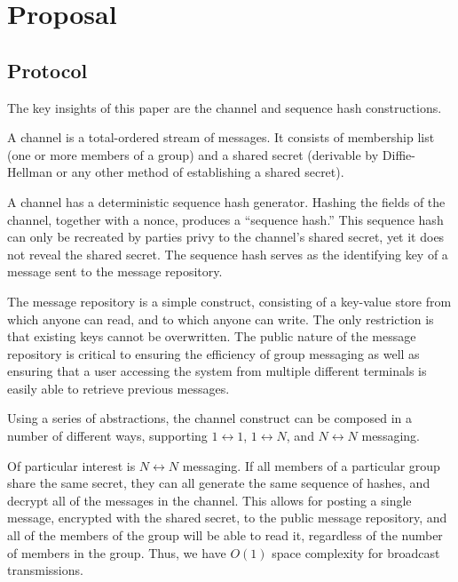 \chapter{Proposal}\label{Proposal}

\section{Protocol}\label{protocol}

The key insights of this paper are the channel and sequence hash constructions.

A channel is a total-ordered stream of messages. It consists of membership list (one or more members of a group) and a shared secret (derivable by Diffie-Hellman or any other method of establishing a shared secret). \parencite{diffie_new_1976}

A channel has a deterministic sequence hash generator. Hashing the fields of the channel, together with a nonce, produces a ``sequence hash.'' This sequence hash can only be recreated by parties privy to the channel's shared secret, yet it does not reveal the shared secret. The sequence hash serves as the identifying key of a message sent to the message repository.

The message repository is a simple construct, consisting of a key-value store from which anyone can read, and to which anyone can write. The only restriction is that existing keys cannot be overwritten. The public nature of the message repository is critical to ensuring the efficiency of group messaging as well as ensuring that a user accessing the system from multiple different terminals is easily able to retrieve previous messages.

Using a series of abstractions, the channel construct can be composed in a number of different ways, supporting $1 \leftrightarrow 1$, $1 \leftrightarrow N$, and $N \leftrightarrow N$ messaging.

Of particular interest is $N \leftrightarrow N$ messaging. If all members of a particular group share the same secret, they can all generate the same sequence of hashes, and decrypt all of the messages in the channel. This allows for posting a single message, encrypted with the shared secret, to the public message repository, and all of the members of the group will be able to read it, regardless of the number of members in the group. Thus, we have $O(1)$ space complexity for broadcast transmissions.

